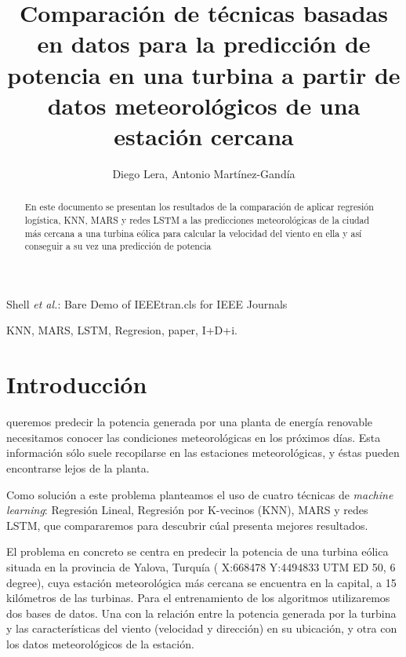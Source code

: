 \documentclass[journal]{IEEEtran}
\begin{document}
\title{Comparación de técnicas basadas en datos para la predicción de potencia en una turbina a partir de datos meteorológicos de una estación cercana}

\author{Diego Lera, Antonio Martínez-Gandía}%

%
{Shell \MakeLowercase{\textit{et al.}}: Bare Demo of IEEEtran.cls for IEEE Journals}

\maketitle

\begin{abstract}
En este documento se presentan los resultados de la comparación de aplicar regresión logística, KNN, MARS y redes LSTM a las predicciones meteorológicas de la ciudad más cercana a una turbina eólica para calcular la velocidad del viento en ella y así conseguir a su vez una predicción de potencia
\end{abstract}

\begin{IEEEkeywords}
KNN, MARS, LSTM, Regresion, paper, I+D+i.
\end{IEEEkeywords}







\IEEEpeerreviewmaketitle



\section{Introducción}
 queremos predecir la potencia generada por una planta de energía renovable necesitamos conocer las condiciones meteorológicas en los próximos días. Esta información sólo suele recopilarse en las estaciones meteorológicas, y éstas pueden encontrarse lejos de la planta. 

Como solución a este problema planteamos el uso de cuatro técnicas de \emph{machine learning}: Regresión Lineal, Regresión por K-vecinos (KNN), MARS y redes LSTM, que compararemos para descubrir cúal presenta mejores resultados.

El problema en concreto se centra en  predecir la potencia de una turbina eólica situada en la provincia de Yalova, Turquía ( X:668478 Y:4494833 UTM ED 50, 6 degree), cuya estación meteorológica más cercana se encuentra en la capital, a 15 kilómetros de las turbinas.
Para el entrenamiento de los algoritmos utilizaremos dos bases de datos. Una con la relación entre la potencia generada por la turbina y las características del viento (velocidad y dirección) en su ubicación, y otra con los datos meteorológicos de la estación.
\end{document}
